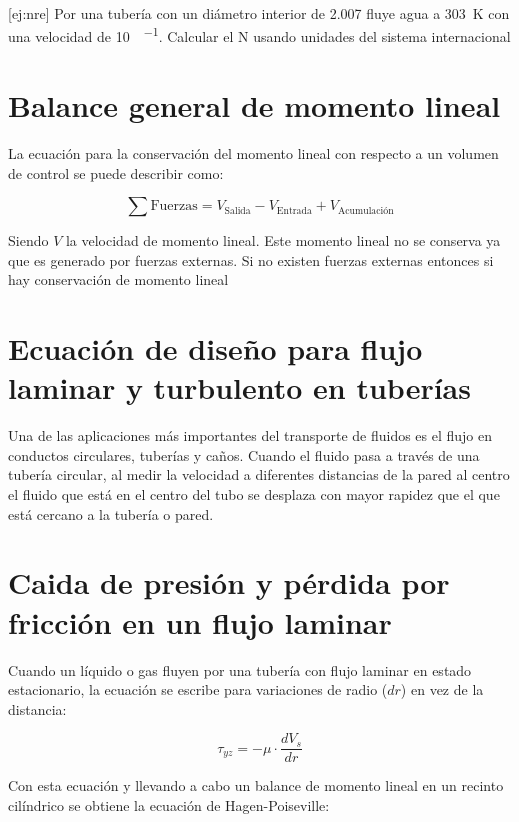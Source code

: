 \documentclass{AsignaturaResumen}
\begin{document}
[ej:nre]{\footnotesize 
    Por una tubería con un diámetro interior de \qty{2.007}{\in} fluye agua a \qty{303}{\K} con una velocidad de \qty{10}{\gal\per\min}. Calcular el N usando unidades del sistema internacional 
}


\section{Balance general de momento lineal}

La ecuación para la conservación del momento lineal con respecto a un volumen de control se puede describir como:

\begin{equation*}
    \sum{\text{Fuerzas}} = V_{\text{Salida}} - V_{\text{Entrada}} + V_{\text{Acumulación}}
\end{equation*}

Siendo $V$ la velocidad de momento lineal. Este momento lineal no se conserva ya que es generado por fuerzas externas. Si no existen fuerzas externas entonces si hay conservación de momento lineal

\section{Ecuación de diseño para flujo laminar y turbulento en tuberías}

Una de las aplicaciones más importantes del transporte de fluidos es el flujo en conductos circulares, tuberías y caños. Cuando el fluido pasa a través de una tubería circular, al medir la velocidad a diferentes distancias de la pared al centro el fluido que está en el centro del tubo se desplaza con mayor rapidez que el que está cercano a la tubería o pared.

\section{Caida de presión y pérdida por fricción en un flujo laminar}

Cuando un líquido o gas fluyen por una tubería con flujo laminar en estado estacionario, la ecuación se escribe para variaciones de radio ($dr$) en vez de la distancia:

\begin{equation}
    \tau_{yz} = -\mu \cdot \frac{dV_{s}}{dr}
\end{equation}

Con esta ecuación y llevando a cabo un balance de momento lineal en un recinto cilíndrico se obtiene la ecuación de Hagen-Poiseville:
\end{document}
